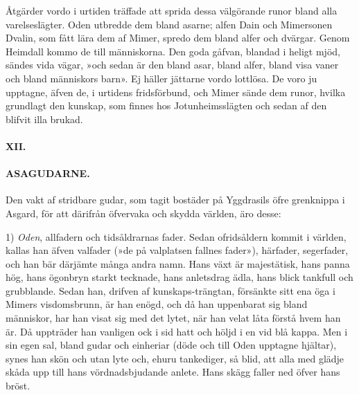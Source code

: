 Åtgärder vordo i urtiden träffade att sprida dessa välgörande runor
bland alla varelseslägter. Oden utbredde dem
\protect\hypertarget{lb1625905.xhtmlux5cux23start25}{}{}\protect\hypertarget{lb1625905.xhtmlux5cux23start25-a}{}{}\protect\hypertarget{lb1625905.xhtmlux5cux23start25-b}{}{}\protect\hypertarget{lb1625905.xhtmlux5cux23start25-c}{}{}\protect\hypertarget{lb1625905.xhtmlux5cux23start25-d}{}{}
bland asarne; alfen Dain och Mimersonen Dvalin, som fått lära dem af
Mimer, spredo dem bland alfer och dvärgar. Genom Heimdall kommo de till
människorna. Den goda gåfvan, blandad i heligt mjöd, sändes vida vägar,
»och sedan är den bland asar, bland alfer, bland visa vaner och bland
människors barn». Ej häller jättarne vordo lottlösa. De voro ju
upptagne, äfven de, i urtidens fridsförbund, och Mimer sände dem runor,
hvilka grundlagt den kunskap, som finnes hos Jotunheimsslägten och sedan
af den blifvit illa brukad.

\paragraph{XII.}

\paragraph{ASAGUDARNE.}

Den vakt af stridbare gudar, som tagit bostäder på Yggdrasils öfre
grenknippa i Asgard, för att därifrån öfvervaka och skydda världen, äro
desse:

1) \emph{Oden}, allfadern och tidsåldrarnas fader. Sedan ofridsåldern
kommit i världen, kallas han äfven valfader (»de på valplatsen fallnes
fader»), härfader, segerfader, och han bär därjämte många andra namn.
Hans växt är majestätisk, hans panna hög, hans ögonbryn starkt tecknade,
hans anletsdrag ädla, hans blick tankfull och grubblande. Sedan han,
drifven af kunskaps-trängtan, försänkte sitt ena öga i Mimers
visdomsbrunn, är han enögd, och då han uppenbarat sig bland människor,
har han visat sig med det lytet, när han velat låta förstå hvem han är.
Då uppträder han vanligen ock i sid hatt och höljd i en vid blå kappa.
Men i sin egen sal, bland gudar och einheriar (döde och till Oden
upptagne hjältar), synes han skön och utan lyte och, ehuru tankediger,
så blid, att alla med glädje skåda upp till hans vördnadsbjudande
anlete. Hans skägg faller ned öfver hans bröst.

